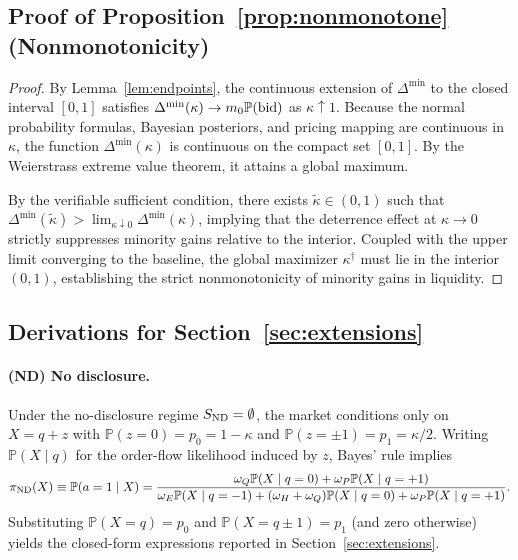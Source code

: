 \documentclass[11pt]{article}
\newcommand{\PP}{\mathbb{P}}
\newcommand{\1}{\mathbf{1}}
\begin{document}
\subsection{Proof of Proposition~\ref{prop:nonmonotone} (Nonmonotonicity)}
\label{app:proof-nonmonotone}

\begin{proof}
By Lemma~\ref{lem:endpoints}, the continuous extension of $\Delta^{\min}$ to the closed interval $[0,1]$ satisfies $\Delta^{\min}(\kappa)\to m_0\PP(\textup{bid})$ as $\kappa \uparrow 1$. Because the normal probability formulas, Bayesian posteriors, and pricing mapping are continuous in $\kappa$, the function $\Delta^{\min}(\kappa)$ is continuous on the compact set $[0,1]$. By the Weierstrass extreme value theorem, it attains a global maximum.

By the verifiable sufficient condition, there exists $\tilde{\kappa}\in(0,1)$ such that $\Delta^{\min}(\tilde{\kappa}) > \lim_{\kappa \downarrow 0} \Delta^{\min}(\kappa)$, implying that the deterrence effect at $\kappa \to 0$ strictly suppresses minority gains relative to the interior. Coupled with the upper limit converging to the baseline, the global maximizer $\kappa^\dagger$ must lie in the interior $(0,1)$, establishing the strict nonmonotonicity of minority gains in liquidity.
\end{proof}

\subsection{Derivations for Section~\ref{sec:extensions}}
\label{app:extensions-derivations}

\paragraph{(ND) No disclosure.}
Under the no-disclosure regime $S_{\textup{ND}}=\emptyset$, the market conditions only on $X=q+z$ with
$\PP(z=0)=p_0=1-\kappa$ and $\PP(z=\pm1)=p_1=\kappa/2$. Writing $\PP(X \mid q)$ for the order-flow likelihood induced by $z$, Bayes' rule implies
\[
\pi_{\textup{ND}}(X)\equiv \PP(a=1 \mid X)
=\frac{\omega_Q\PP(X \mid q=0)+\omega_P\PP(X \mid q=+1)}
{\omega_E\PP(X \mid q=-1)+(\omega_H+\omega_Q)\PP(X \mid q=0)+\omega_P\PP(X \mid q=+1)}.
\]
Substituting $\PP(X=q)=p_0$ and $\PP(X=q\pm1)=p_1$ (and zero otherwise) yields the closed-form expressions reported in Section~\ref{sec:extensions}.
\end{document}
